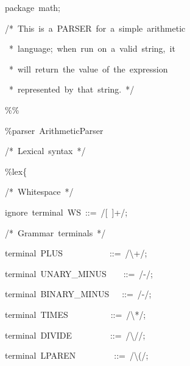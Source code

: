 \documentclass[12pt,english,twoside]{report}
\newenvironment{codeblock}
{\begin{list}{}{
\setlength{\rightmargin}{\leftmargin}
\setlength{\listparindent}{0pt}%
\raggedright
\setlength{\itemsep}{0pt}
\setlength{\parsep}{0pt}
\normalfont\ttfamily}%
 \item[]}
{\end{list}}
\begin{document}
\begin{algorithm}
\begin{codeblock}
{\small package~math;}{\small \par}

{\small /{*}~This~is~a~PARSER~for~a~simple~arithmetic}{\small \par}

~{\small {*}~language;~when~run~on~a~valid~string,~it}{\small \par}

~{\small {*}~will~return~the~value~of~the~expression}{\small \par}

~{\small {*}~represented~by~that~string.~{*}/}{\small \par}

{\small \%\%}{\small \par}

{\small \%parser~ArithmeticParser}{\small \par}



{\small /{*}~Lexical~syntax~{*}/}{\small \par}

{\small \%lex\{}{\small \par}
\begin{codeblock}
{\small /{*}~Whitespace~{*}/}{\small \par}

{\small ignore~terminal~WS~::=~/{[}~]+/;}{\small \par}



{\small /{*}~Grammar~terminals~{*}/}{\small \par}

{\small terminal~PLUS~~~~~~~~~~~::=~/\textbackslash{}+/;}{\small \par}

{\small terminal~UNARY\_MINUS~~~~::=~/-/;}{\small \par}

{\small terminal~BINARY\_MINUS~~~::=~/-/;}{\small \par}

{\small terminal~TIMES~~~~~~~~~~::=~/\textbackslash{}{*}/;}{\small \par}

{\small terminal~DIVIDE~~~~~~~~~::=~/\textbackslash{}//;}{\small \par}

{\small terminal~LPAREN~~~~~~~~~::=~/\textbackslash{}(/;}{\small \par}


\end{codeblock}
\end{codeblock}
\end{algorithm}
\end{document}
